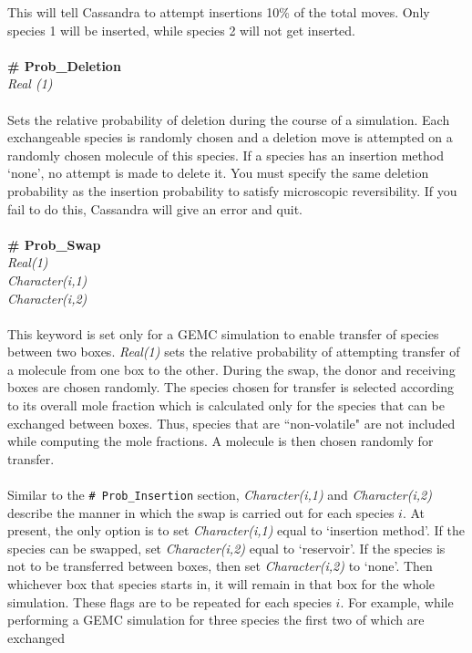 %
This will tell Cassandra to attempt insertions 10\% of the total moves. Only
species 1 will be inserted, while species 2 will not get inserted. \\ \\
%
%
{\bf \# Prob\_Deletion} \\
{\it Real (1)} \\ \\
%
Sets the relative probability of deletion during the course of a
simulation. Each exchangeable species is randomly chosen and a
deletion move is attempted on a randomly chosen molecule 
of this species. If a species has an insertion method `none', no
attempt is made to delete it. You must specify the same deletion
probability as the insertion probability to satisfy microscopic
reversibility. If you fail to do this, Cassandra will give an error
and quit.  \\ \\
%
{\bf \# Prob\_Swap}\\
{\it
Real(1) \\ 
Character(i,1) \\
Character(i,2) \\ \\}
%
This keyword is set only for a GEMC simulation to enable transfer of species between two boxes. {\em Real(1)} sets the relative probability of attempting transfer of a molecule from one box to
the other. During the swap, the donor and receiving boxes are chosen randomly. The species chosen for transfer is selected according to its overall mole fraction which is calculated only for
the species that can be exchanged between boxes. Thus, species that are ``non-volatile" are not included while computing the mole fractions. A molecule is then chosen randomly for transfer. \\ \\
%
Similar to the \texttt{\# Prob\_Insertion} section, {\em Character(i,1)} and {\em Character(i,2)} describe the manner in which the swap is carried out for each species $i$. 
At present, the only option is to set {\em Character(i,1)} equal to `insertion method'.  If the species can be swapped, set {\em Character(i,2)} equal to `reservoir'. If the species is not to be
transferred between boxes, then set {\em Character(i,2)} to `none'. Then whichever box that species starts in, it will remain in that box for the whole simulation. These flags are to be repeated
for each species $i$.  For example, while performing a GEMC simulation for three species the first two of which are exchanged
